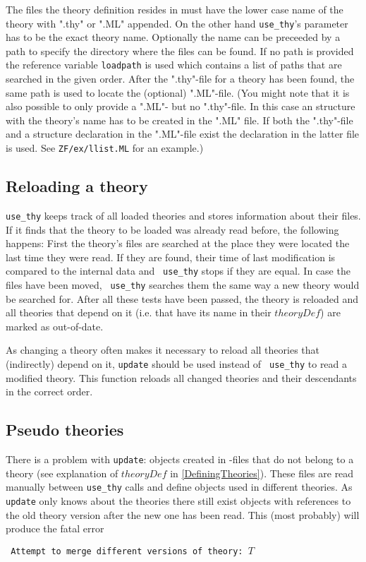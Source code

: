 The files the theory definition resides in must have the lower case name of
the theory with ".thy" or ".ML" appended.  On the other hand {\tt use_thy}'s
parameter has to be the exact theory name.  Optionally the name can be
preceeded by a path to specify the directory where the files can be found.  If
no path is provided the reference variable {\tt loadpath} is used which
contains a list of paths that are searched in the given order.  After the
".thy"-file for a theory has been found, the same path is used to locate the
(optional) ".ML"-file.  (You might note that it is also possible to only
provide a ".ML"- but no ".thy"-file.  In this case an \ML{} structure with the
theory's name has to be created in the ".ML" file.  If both the ".thy"-file
and a structure declaration in the ".ML"-file exist the declaration in the
latter file is used.  See {\tt ZF/ex/llist.ML} for an example.)


\subsection{Reloading a theory}

{\tt use_thy} keeps track of all loaded theories and stores information about
their files.  If it finds that the theory to be loaded was already read
before, the following happens: First the theory's files are searched at the
place they were located the last time they were read. If they are found,
their time of last modification is compared to the internal data and {\tt
  use_thy} stops if they are equal. In case the files have been moved, {\tt
  use_thy} searches them the same way a new theory would be searched for.
After all these tests have been passed, the theory is reloaded and all
theories that depend on it (i.e. that have its name in their $theoryDef$) are
marked as out-of-date.

As changing a theory often makes it necessary to reload all theories that
(indirectly) depend on it, {\tt update} should be used instead of {\tt
use_thy} to read a modified theory.  This function reloads all changed
theories and their descendants in the correct order.


\subsection{Pseudo theories}

There is a problem with {\tt update}: objects created in \ML-files that do not
belong to a theory (see explanation of $theoryDef$ in \ref{DefiningTheories}).
These files are read manually between {\tt use_thy} calls and define objects
used in different theories.  As {\tt update} only knows about the
theories there still exist objects with references to the old theory version
after the new one has been read.  This (most probably) will produce the fatal
error
\begin{center} \tt
Attempt to merge different versions of theory: $T$
\end{center}

